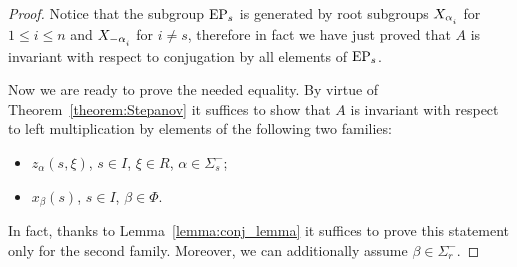 \begin{proof}
  Notice that the subgroup $\operatorname{EP}_s$ is generated by root subgroups $X_{\alpha\ssub{i}}$ for $1\leq i\leq n$ and $X_{-\alpha\ssub{i}}$ for $i\neq s$,
therefore in fact we have just proved that $A$ is invariant with respect to conjugation by all elements of $\operatorname{EP}_s$.

Now we are ready to prove the needed equality. By virtue of Theorem~\ref{theorem:Stepanov} it suffices to show that
$A$ is invariant with respect to left multiplication by elements of the following two families:
\begin{itemize}
 \item $z_{\alpha}(s, \xi)$, $s\in I$, $\xi \in R$, $\alpha\in\Sigma^-_s$;
 \item $x_{\beta}(s)$, $s \in I$, $\beta \in \Phi$. \end{itemize}
In fact, thanks to Lemma~\ref{lemma:conj_lemma} it suffices to prove this statement only for the second family.
Moreover, we can additionally assume $\beta\in \Sigma_r^-$.
\end{proof}

